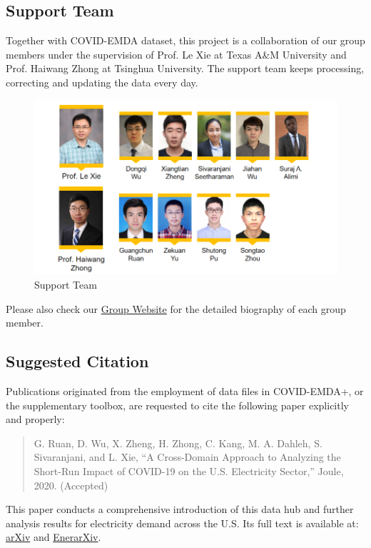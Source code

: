 \documentclass[10pt]{article}
\numberwithin{equation}{section}
\numberwithin{table}{section}
\numberwithin{figure}{section}
\begin{document}
\subsection{Support Team}

Together with COVID-EMDA dataset, this project is a collaboration of our group members under the supervision of Prof. Le Xie at Texas A\&M University and Prof. Haiwang Zhong at Tsinghua University. The support team keeps processing, correcting and updating the data every day.

\begin{figure}[!ht]
    \centering
    \includegraphics[width=.8\textwidth]{figures/contributor-extend-20210408.png}
    \caption{Support Team}
\end{figure}

Please also check our \href{https://gridx.engr.tamu.edu/?page_id=30}{Group Website} for the detailed biography of each group member.

\subsection{Suggested Citation}
Publications originated from the employment of data files in COVID-EMDA+, or the supplementary toolbox, are requested to cite the following paper explicitly and properly: 

\begin{quotation}\footnotesize
G. Ruan, D. Wu, X. Zheng, H. Zhong, C. Kang, M. A. Dahleh, S. Sivaranjani, and L. Xie, ``A Cross-Domain Approach to Analyzing the Short-Run Impact of COVID-19 on the U.S. Electricity Sector,'' Joule, 2020. (Accepted)
\end{quotation}

This paper conducts a comprehensive introduction of this data hub and further analysis results for electricity demand across the U.S. Its full text is available at: \href{https://arxiv.org/abs/2005.06631}{arXiv} and \href{http://www.enerarxiv.org/page/thesis.html?id=1840}{EnerarXiv}.
\end{document}
